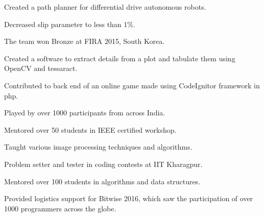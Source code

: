 \documentclass[a4paper]{deedy-resume} %
\begin{document}
\begin{minipage}[t]{0.66\textwidth}
  \sectionspace

  \runsubsection{}
  \begin{tightitemize}
  \item Created a path planner for differential drive autonomous robots.
  \item Decreased slip parameter to less than 1\%.
  \item The team won Bronze at FIRA 2015, South Korea.
  \end{tightitemize}

  \sectionspace

  \runsubsection{}
  \begin{tightitemize}
  \item Created a software to extract details from a plot and tabulate them using OpenCV and tessaract.
  \end{tightitemize}

  \sectionspace

  \runsubsection{}
  \begin{tightitemize}
  \item Contributed to back end of an online game made using CodeIgnitor framework in php.
  \item Played by over 1000 participants from across India.
  \end{tightitemize}


  \sectionspace

  \runsubsection{}
  \begin{tightitemize}
  \item Mentored over 50 students in IEEE certified workshop.
  \item Taught various image processing techniques and algorithms.
  \end{tightitemize}

  \sectionspace

  \runsubsection{}
  \begin{tightitemize}
  \item Problem setter and tester in coding contests at IIT Kharagpur.
  \item Mentored over 100 students in algorithms and data structures.
  \item Provided logistics support for Bitwise 2016, which saw the participation of over 1000 programmers across the globe.
  \end{tightitemize}
  

\end{minipage}
\end{document}
